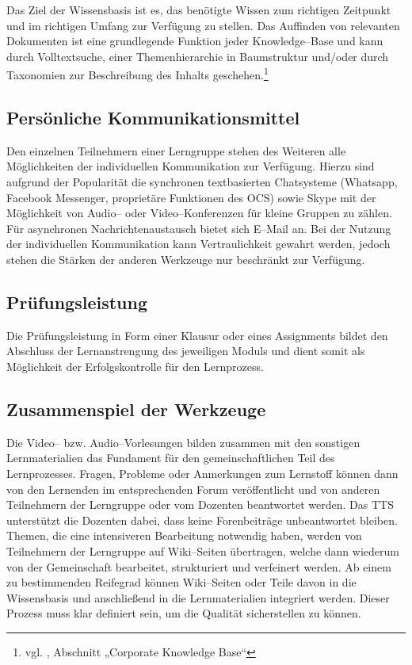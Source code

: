 Das Ziel der Wissensbasis ist es, das benötigte Wissen zum richtigen Zeitpunkt und im richtigen Umfang zur Verfügung zu stellen.
Das Auffinden von relevanten Dokumenten ist eine grundlegende Funktion jeder Knowledge–Base und kann durch Volltextsuche, einer Themenhierarchie in Baumstruktur und/oder durch Taxonomien zur Beschreibung des Inhalts geschehen.\footnote{vgl. \cite{altwies}, Abschnitt „Corporate Knowledge Base“} 


\subsection{Persönliche Kommunikationsmittel} %
\label{sub:personliche_kommunikationsmittel}
Den einzelnen Teilnehmern einer Lerngruppe stehen des Weiteren alle Möglichkeiten der individuellen Kommunikation zur Verfügung. Hierzu sind aufgrund der Popularität die synchronen textbasierten Chatsysteme (Whatsapp, Facebook Messenger, proprietäre Funktionen des \ac{OCS}) sowie Skype mit der Möglichkeit von Audio– oder Video–Konferenzen für kleine Gruppen zu zählen. Für asynchronen Nachrichtenaustausch bietet sich E–Mail an. Bei der Nutzung der individuellen Kommunikation kann Vertraulichkeit gewahrt werden, jedoch stehen die Stärken der anderen Werkzeuge nur beschränkt zur Verfügung. 

\subsection{Prüfungsleistung} %
\label{sub:prufungsleistung}
Die Prüfungsleistung in Form einer Klausur oder eines Assignments bildet den Abschluss der Lernanstrengung des jeweiligen Moduls und dient somit als Möglichkeit der Erfolgskontrolle für den Lernprozess.

\subsection{Zusammenspiel der Werkzeuge} %
\label{sub:zusammenspiel_der_werkzeuge}
Die Video– bzw. Audio–Vorlesungen bilden zusammen mit den sonstigen Lernmaterialien das Fundament für den gemeinschaftlichen Teil des Lernprozesses. Fragen, Probleme oder Anmerkungen zum Lernstoff können dann von den Lernenden im entsprechenden Forum veröffentlicht und von anderen Teilnehmern der Lerngruppe oder vom Dozenten beantwortet werden. Das \ac{TTS} unterstützt die Dozenten dabei, dass keine Forenbeiträge unbeantwortet bleiben.
Themen, die eine intensiveren Bearbeitung notwendig haben, werden von Teilnehmern der Lerngruppe auf Wiki–Seiten übertragen, welche dann wiederum von der Gemeinschaft bearbeitet, strukturiert und verfeinert werden. Ab einem zu bestimmenden Reifegrad können Wiki–Seiten oder Teile davon in die Wissensbasis und anschließend in die Lernmaterialien integriert werden. Dieser Prozess muss klar definiert sein, um die Qualität sicherstellen zu können. 

